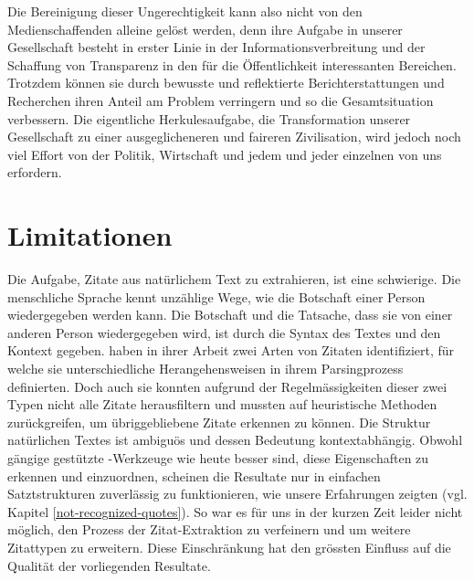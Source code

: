 Die Bereinigung dieser Ungerechtigkeit kann also nicht von den Medienschaffenden alleine gelöst werden, denn
ihre Aufgabe in unserer Gesellschaft besteht in erster Linie in der Informationsverbreitung und der Schaffung
von Transparenz in den für die Öffentlichkeit interessanten Bereichen. Trotzdem können sie durch bewusste und reflektierte
Berichterstattungen und Recherchen ihren Anteil am Problem verringern und so die Gesamtsituation verbessern.
Die eigentliche Herkulesaufgabe, die Transformation unserer Gesellschaft zu einer ausgeglicheneren und
faireren Zivilisation, wird jedoch noch viel Effort von der Politik, Wirtschaft und jedem und jeder einzelnen von uns erfordern. %

\section {Limitationen}\label{limitations}


Die Aufgabe, Zitate aus natürlichem Text zu extrahieren, ist eine schwierige. Die
menschliche Sprache kennt unzählige Wege, wie die Botschaft einer Person wiedergegeben
werden kann. Die Botschaft und die Tatsache, dass sie von einer anderen Person wiedergegeben wird,
ist durch die Syntax des Textes und den Kontext gegeben. \citeauthor{gender_gap_tracker} haben in
ihrer Arbeit \cite{gender_gap_tracker} zwei Arten von Zitaten identifiziert, für welche sie unterschiedliche
Herangehensweisen in ihrem Parsingprozess definierten. Doch auch sie konnten aufgrund der Regelmässigkeiten dieser
zwei Typen nicht alle Zitate herausfiltern und mussten auf heuristische Methoden zurückgreifen,
um übriggebliebene Zitate erkennen zu können. Die Struktur natürlichen Textes ist ambiguös und dessen Bedeutung
kontextabhängig. Obwohl gängige  gestützte
-Werkzeuge wie  heute besser sind, diese Eigenschaften zu erkennen und einzuordnen,
scheinen die Resultate nur in einfachen Satztstrukturen zuverlässig zu funktionieren, wie unsere
Erfahrungen zeigten (vgl. Kapitel \ref{not-recognized-quotes}). So war es für uns in der kurzen Zeit
leider nicht möglich, den Prozess der Zitat-Extraktion zu verfeinern und um weitere Zitattypen zu erweitern.
Diese Einschränkung hat den grössten Einfluss auf die Qualität der vorliegenden Resultate.

